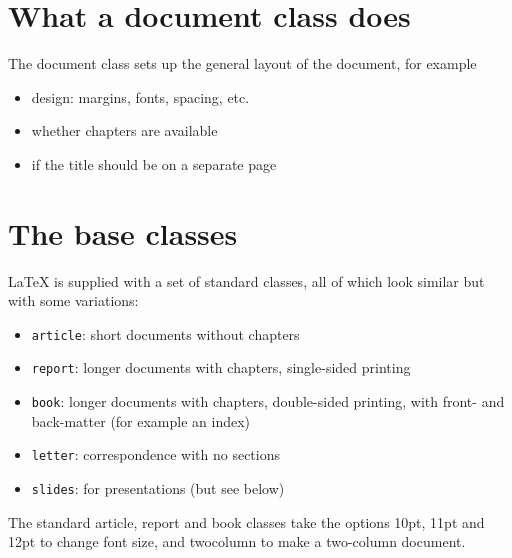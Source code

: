\documentclass{article}
\begin{document}
\section{What a document class does}
The document class sets up the general layout of the document, for example

\begin{itemize}
    \item design: margins, fonts, spacing, etc.
    \item whether chapters are available
    \item if the title should be on a separate page
\end{itemize}

\section{The base classes}
LaTeX is supplied with a set of standard classes, all of which look similar but with some variations:

\begin{itemize}
    \item \texttt{article}: short documents without chapters
    \item \texttt{report}: longer documents with chapters, single-sided printing
    \item \texttt{book}: longer documents with chapters, double-sided printing, with front- and back-matter (for example an index)
    \item \texttt{letter}: correspondence with no sections
    \item \texttt{slides}: for presentations (but see below)
\end{itemize}

The standard article, report and book classes take the options 10pt, 11pt and 12pt to change font size, and twocolumn to make a two-column document.
\end{document}
